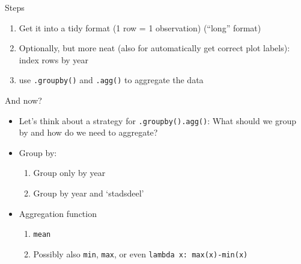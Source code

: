 \documentclass[compress]{beamer}
\begin{document}
{
	\begin{frame}[plain]
\end{frame}
}

\begin{frame}{Steps}
\begin{enumerate}
	\item Get it into a tidy format (1 row = 1 observation) (``long'' format)
	\item Optionally, but more neat (also for automatically get correct plot labels): \\ index rows by year
	\item use \texttt{.groupby()} and \texttt{.agg()} to aggregate the data
\end{enumerate}
\end{frame}


{
	\begin{frame}[plain]
\end{frame}
}


\begin{frame}{And now?}
\begin{itemize}[<+->]
	\item Let’s think about a strategy for \texttt{.groupby().agg()}: What should we group by and how do we need to aggregate?
	\item Group by:
	\begin{enumerate}
		\item Group only by year
		\item  Group by year and `stadsdeel'
	\end{enumerate}
	\item Aggregation function
	\begin{enumerate}
		\item \texttt{mean}
		\item Possibly also \texttt{min}, \texttt{max}, or even \texttt{lambda x: max(x)-min(x)}
	\end{enumerate}
\end{itemize}

\end{frame}
\end{document}
